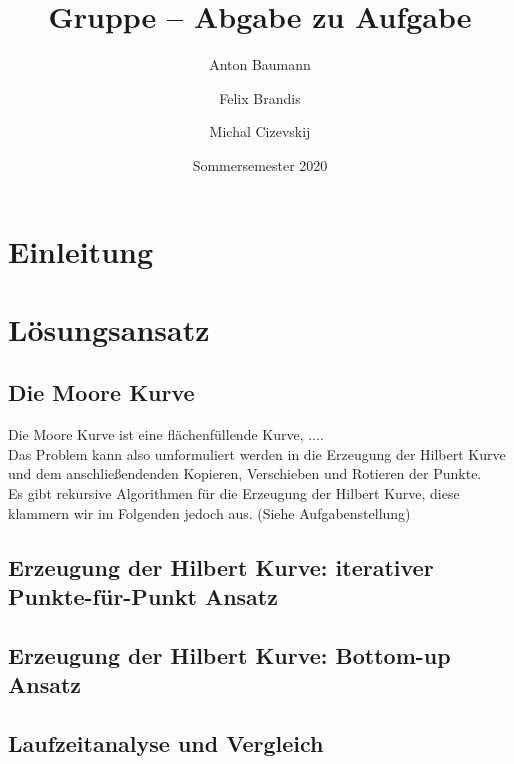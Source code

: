 \documentclass[course=erap]{aspdoc}
\author{Anton Baumann \and Felix Brandis \and Michal Cizevskij}
\date{Sommersemester 2020}  %
\title{Gruppe \theGroup{} -- Abgabe zu Aufgabe \theNumber}
\begin{document}
\maketitle

\section{Einleitung}


\section{Lösungsansatz}

\subsection{Die Moore Kurve}

Die Moore Kurve ist eine flächenfüllende Kurve, 
....\ \\
Das Problem kann also umformuliert werden in die Erzeugung der Hilbert Kurve und dem anschließendenden Kopieren, Verschieben und Rotieren der Punkte. 
\\
Es gibt rekursive Algorithmen für die Erzeugung der Hilbert Kurve, diese klammern wir im Folgenden jedoch aus. (Siehe Aufgabenstellung)

\subsection{Erzeugung der Hilbert Kurve: iterativer Punkte-für-Punkt Ansatz}





\subsection{Erzeugung der Hilbert Kurve: Bottom-up Ansatz}

\subsection{Laufzeitanalyse und Vergleich}




\end{document}
